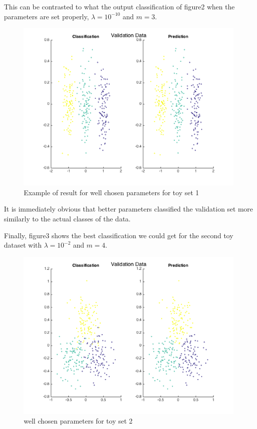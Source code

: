 \documentclass[12pt, twocolumn]{article}
\begin{document}
This can be contrasted to what the output classification of figure2 when the parameters are set properly, $\lambda=10^{-10}$ and $m=3$.

\begin{figure}
\includegraphics[scale=.4]{toy1val_lambda_min10_m_3.png}
\caption{ Example of result for well chosen parameters for toy set 1}
\end{figure}

It is immediately obvious that better parameters classified the validation set more similarly to the actual classes of the data. 

Finally, figure3 shows the best classification we could get for the second toy dataset with $\lambda=10^{-2}$ and $m=4$.

\begin{figure}
\includegraphics[scale=.4]{toy2val_lambda_min2_m_34.png}
\caption{ well chosen parameters for toy set 2}
\end{figure}
\end{document}
